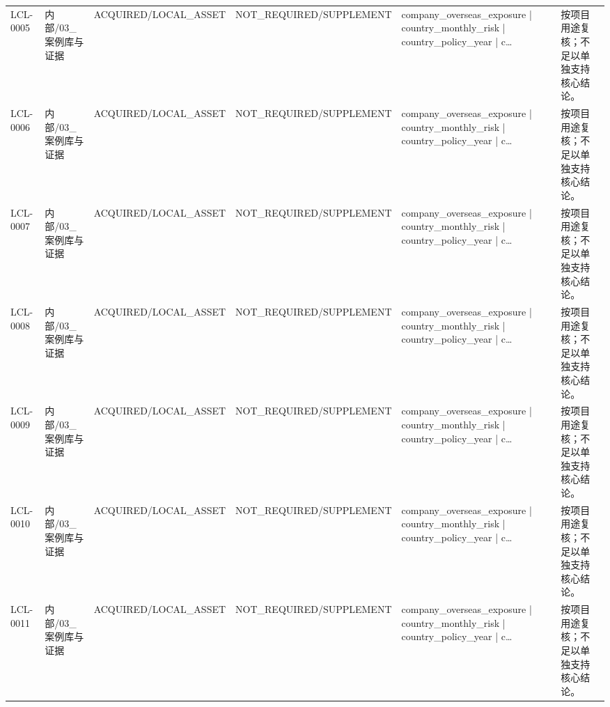 \begin{landscape}
\begin{longtable}{p{1.8cm}p{2.6cm}p{2.6cm}p{2.6cm}p{4.8cm}p{7.2cm}}
LCL-0005 & 内部/\allowbreak{}03\_\allowbreak{}案例库与证据 & ACQUIRED/\allowbreak{}LOCAL\_\allowbreak{}ASSET & NOT\_\allowbreak{}REQUIRED/\allowbreak{}SUPPLEMENT & company\_\allowbreak{}overseas\_\allowbreak{}exposure | country\_\allowbreak{}monthly\_\allowbreak{}risk | country\_\allowbreak{}policy\_\allowbreak{}year | c… & 按项目用途复核；不足以单独支持核心结论。\\
LCL-0006 & 内部/\allowbreak{}03\_\allowbreak{}案例库与证据 & ACQUIRED/\allowbreak{}LOCAL\_\allowbreak{}ASSET & NOT\_\allowbreak{}REQUIRED/\allowbreak{}SUPPLEMENT & company\_\allowbreak{}overseas\_\allowbreak{}exposure | country\_\allowbreak{}monthly\_\allowbreak{}risk | country\_\allowbreak{}policy\_\allowbreak{}year | c… & 按项目用途复核；不足以单独支持核心结论。\\
LCL-0007 & 内部/\allowbreak{}03\_\allowbreak{}案例库与证据 & ACQUIRED/\allowbreak{}LOCAL\_\allowbreak{}ASSET & NOT\_\allowbreak{}REQUIRED/\allowbreak{}SUPPLEMENT & company\_\allowbreak{}overseas\_\allowbreak{}exposure | country\_\allowbreak{}monthly\_\allowbreak{}risk | country\_\allowbreak{}policy\_\allowbreak{}year | c… & 按项目用途复核；不足以单独支持核心结论。\\
LCL-0008 & 内部/\allowbreak{}03\_\allowbreak{}案例库与证据 & ACQUIRED/\allowbreak{}LOCAL\_\allowbreak{}ASSET & NOT\_\allowbreak{}REQUIRED/\allowbreak{}SUPPLEMENT & company\_\allowbreak{}overseas\_\allowbreak{}exposure | country\_\allowbreak{}monthly\_\allowbreak{}risk | country\_\allowbreak{}policy\_\allowbreak{}year | c… & 按项目用途复核；不足以单独支持核心结论。\\
LCL-0009 & 内部/\allowbreak{}03\_\allowbreak{}案例库与证据 & ACQUIRED/\allowbreak{}LOCAL\_\allowbreak{}ASSET & NOT\_\allowbreak{}REQUIRED/\allowbreak{}SUPPLEMENT & company\_\allowbreak{}overseas\_\allowbreak{}exposure | country\_\allowbreak{}monthly\_\allowbreak{}risk | country\_\allowbreak{}policy\_\allowbreak{}year | c… & 按项目用途复核；不足以单独支持核心结论。\\
LCL-0010 & 内部/\allowbreak{}03\_\allowbreak{}案例库与证据 & ACQUIRED/\allowbreak{}LOCAL\_\allowbreak{}ASSET & NOT\_\allowbreak{}REQUIRED/\allowbreak{}SUPPLEMENT & company\_\allowbreak{}overseas\_\allowbreak{}exposure | country\_\allowbreak{}monthly\_\allowbreak{}risk | country\_\allowbreak{}policy\_\allowbreak{}year | c… & 按项目用途复核；不足以单独支持核心结论。\\
LCL-0011 & 内部/\allowbreak{}03\_\allowbreak{}案例库与证据 & ACQUIRED/\allowbreak{}LOCAL\_\allowbreak{}ASSET & NOT\_\allowbreak{}REQUIRED/\allowbreak{}SUPPLEMENT & company\_\allowbreak{}overseas\_\allowbreak{}exposure | country\_\allowbreak{}monthly\_\allowbreak{}risk | country\_\allowbreak{}policy\_\allowbreak{}year | c… & 按项目用途复核；不足以单独支持核心结论。\\

\end{longtable}
\end{landscape}
